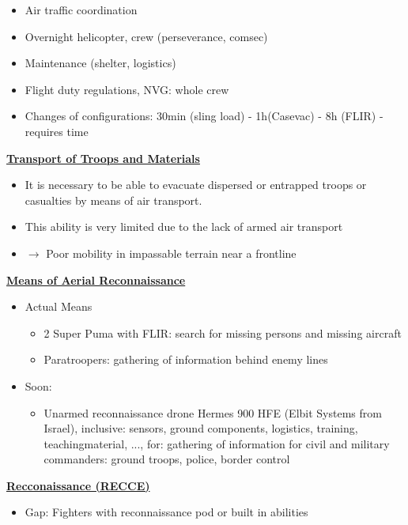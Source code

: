 \documentclass[9pt, landscape, fleqn]{scrartcl}
\begin{document}
\begin{multicols*}{3}
\begin{itemize}
    \item Air traffic coordination 
    \item Overnight helicopter, crew (perseverance, comsec)
    \item Maintenance (shelter, logistics)
    \item Flight duty regulations, NVG: whole crew 
    \item Changes of configurations: 30min (sling load) - 1h(Casevac) - 8h (FLIR) - requires time
\end{itemize}
\underline{\textbf{Transport of Troops and Materials}}
\begin{itemize}
    \item It is necessary to be able to evacuate dispersed or entrapped troops or casualties by means of air transport.
    \item This ability is very limited due to the lack of armed air transport
    \item $\rightarrow$ Poor mobility in impassable terrain near a frontline 
\end{itemize}
\underline{\textbf{Means of Aerial Reconnaissance}}
\begin{itemize}
    \item Actual Means 
    \begin{itemize}
        \item 2 Super Puma with FLIR: search for missing persons and missing aircraft
        \item Paratroopers: gathering of information behind enemy lines
    \end{itemize}
    \item Soon:
    \begin{itemize}
        \item Unarmed reconnaissance drone Hermes 900 HFE (Elbit Systems from Israel), inclusive: sensors, ground components, logistics, training, teachingmaterial, ..., for: gathering of information for civil and military commanders: ground troops, police, border control
    \end{itemize}
\end{itemize}
\underline{\textbf{Recconaissance (RECCE)}}
\begin{itemize}
    \item Gap: Fighters with reconnaissance pod or built in abilities
\end{itemize}
\newpage

\end{multicols*}
\end{document}
